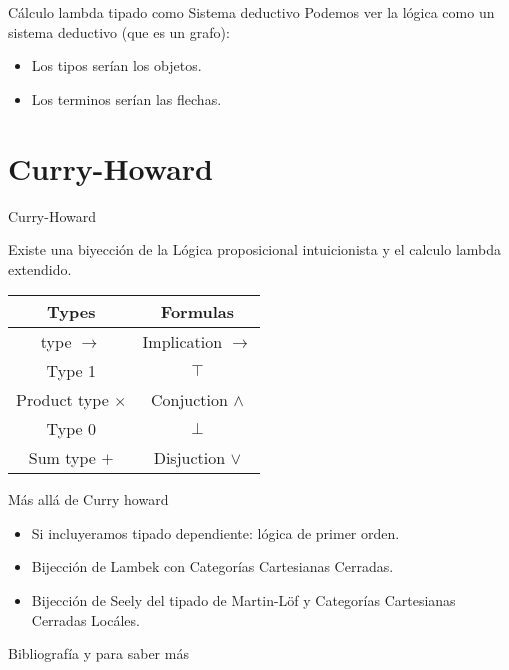 \documentclass[usenames,dvipsnames]{beamer}
\begin{document}
\begin{frame}{Cálculo lambda tipado como Sistema deductivo}
  Podemos ver la lógica como un sistema deductivo (que es un grafo):
  \begin{itemize}
  \item Los tipos serían los objetos.
  \item Los terminos serían las flechas.
  \end{itemize}  
\end{frame}

\section{Curry-Howard}

\begin{frame}{Curry-Howard}

  Existe una biyección de la Lógica proposicional intuicionista y el calculo lambda extendido.
\begin{table}[!h]
\begin{center}
  \begin{tabular}{|c|c|}
  \hline
  Types  & Formulas  \\
  \hline
  type $\to$   & Implication $\to$  \\
  \hline 
  Type 1 & $\top$ \\
  Product type $\times$ & Conjuction $\land$ \\
  \hline
  Type 0 & $\bot$ \\
  Sum type $+$     & Disjuction $\lor$ \\
  \hline
\end{tabular}
\end{center}
\end{table}
  
\end{frame}

\begin{frame}{Más allá de Curry howard}
  \begin{itemize}
  \item Si incluyeramos tipado dependiente: lógica de primer orden.
  \item Bijección de Lambek con Categorías Cartesianas Cerradas.
  \item Bijección de Seely del tipado de Martin-Löf y Categorías Cartesianas Cerradas Locáles. 
  \end{itemize}
\end{frame}

\begin{frame}{Bibliografía y para saber más}

\end{frame}
\end{document}
